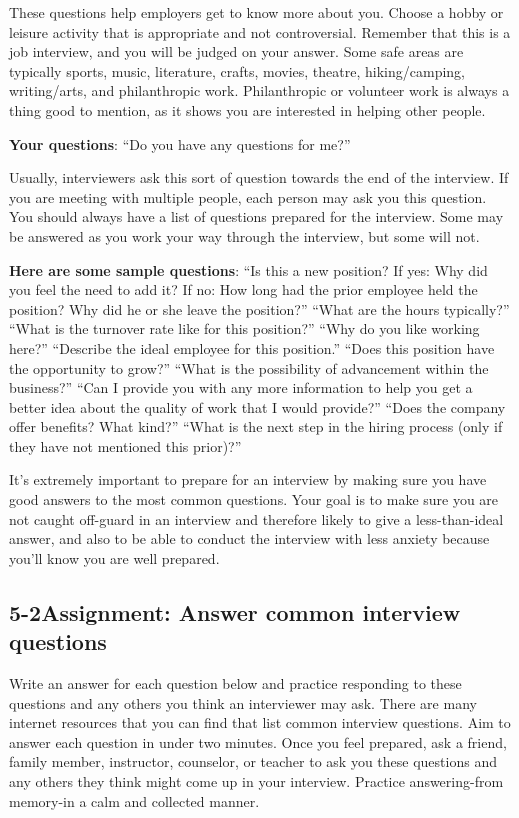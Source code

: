 These questions help employers get to know more about you. Choose a hobby or leisure activity that is appropriate and not controversial. Remember that this is a job interview, and you will be judged on your answer. Some safe areas are typically sports, music, literature, crafts, movies, theatre, hiking/camping, writing/arts, and philanthropic work. Philanthropic or volunteer work is always a thing good to mention, as it shows you are interested in helping other people.

\textbf{Your questions}: ``Do you have any questions for me?''

Usually, interviewers ask this sort of question towards the end of the interview. If you are meeting with multiple people, each person may ask you this question. You should always have a list of questions prepared for the interview. Some may be answered as you work your way through the interview, but some will not.

\textbf{Here are some sample questions}:
\break ``Is this a new position? If yes: Why did you feel the need to add it? If no: How long had the prior employee held the position? Why did he or she leave the position?''
\break ``What are the hours typically?''
\break ``What is the turnover rate like for this position?'' 
\break ``Why do you like working here?''
\break ``Describe the ideal employee for this position.'' 
\break ``Does this position have the opportunity to grow?''
\break ``What is the possibility of advancement within the business?''
\break ``Can I provide you with any more information to help you get a better idea about the quality of work that I would provide?''
\break ``Does the company offer benefits? What kind?''
\break ``What is the next step in the hiring process (only if they have not mentioned this prior)?''

It's extremely important to prepare for an interview by making sure you have good answers to the most common questions. Your goal is to make sure you are not caught off-guard in an interview and therefore likely to give a less-than-ideal answer, and also to be able to conduct the interview with less anxiety because you'll know you are well prepared.

\pagebreak \subsection*{5-2\quad Assignment: Answer common interview questions}
Write an answer for each question below and practice responding to these questions and any others you think an interviewer may ask. There are many internet resources that you can find that list common interview questions. Aim to answer each question in under two minutes. Once you feel prepared, ask a friend, family member, instructor, counselor, or teacher to ask you these questions and any others they think might come up in your interview. Practice answering-from memory-in a calm and collected manner.

